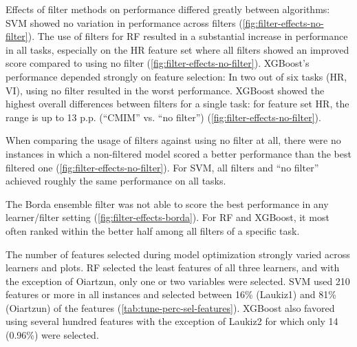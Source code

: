 \documentclass[remotesensing,article,submit,moreauthors,pdftex]{Definitions/mdpi}
\begin{document}
Effects of filter methods on performance differed greatly between algorithms:
SVM showed no variation in performance across filters (\autoref{fig:filter-effects-no-filter}).
The use of filters for RF resulted in a substantial increase in performance in all tasks, especially on the HR feature set where all filters showed an improved score compared to using no filter (\autoref{fig:filter-effects-no-filter}).
XGBoost's performance depended strongly on feature selection: In two out of six tasks (HR, VI), using no filter resulted in the worst performance.
XGBoost showed the highest overall differences between filters for a single task: for feature set HR, the range is up to 13 p.p. (\enquote{CMIM} vs. \enquote{no filter}) (\autoref{fig:filter-effects-no-filter}).

When comparing the usage of filters against using no filter at all, there were no instances in which a non-filtered model scored a better performance than the best filtered one (\autoref{fig:filter-effects-no-filter}).
For SVM, all filters and \enquote{no filter} achieved roughly the same performance on all tasks.

The Borda ensemble filter was not able to score the best performance in any learner/filter setting (\autoref{fig:filter-effects-borda}).
For RF and XGBoost, it most often ranked within the better half among all filters of a specific task.

The number of features selected during model optimization strongly varied across learners and plots.
RF selected the least features of all three learners, and with the exception of Oiartzun, only one or two variables were selected.
SVM used 210 features or more in all instances and selected between 16\% (Laukiz1) and 81\% (Oiartzun) of the features (\autoref{tab:tune-perc-sel-features}).
XGBoost also favored using several hundred features with the exception of Laukiz2 for which only 14 (0.96\%) were selected.




\end{document}
